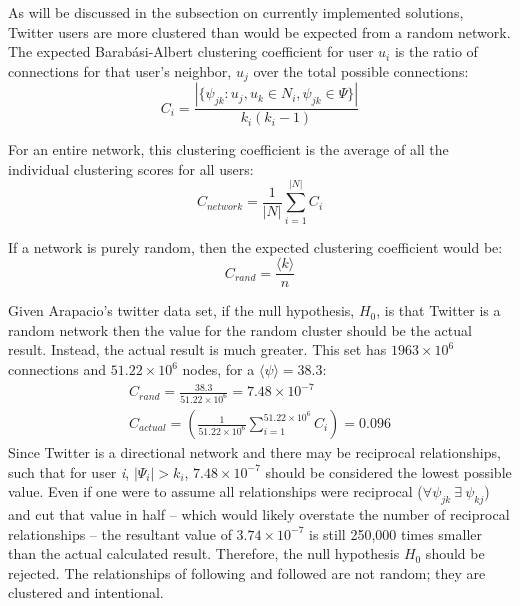 \documentclass[NETN,manuscript]{stjour-new}
\begin{document}
As will be discussed in the subsection on currently implemented solutions, Twitter users are more clustered than would be expected from a random network. The expected Barab{\'a}si-Albert clustering coefficient for user $u_i$ is the ratio of connections for that user's neighbor, $u_j$ over the total possible connections:
\begin{equation}
    C_{i}=\frac{|\{\psi_{jk}: u_j,u_k \in N_i, \psi_{jk} \in \Psi\}|}{k_i(k_i -1)}
\end{equation}

For an entire network, this clustering coefficient is the average of all the individual clustering scores for all users:
\begin{equation}
    C_{network}=\frac{1}{|N|}\sum_{i=1}^{|N|}C_i
\end{equation}

If a network is purely random, then the expected clustering coefficient would be:
\begin{equation}
    C_{rand} = \frac{\langle k \rangle}{n}
\end{equation}

Given Arapacio's twitter data set, if the null hypothesis, $H_0$, is that Twitter is a random network then the value for the random cluster should be the actual result. Instead, the actual result is much greater. This set has $1963 \times 10^6$ connections and $51.22 \times 10^6$ nodes, for a $\langle \psi \rangle = 38.3$:
\begin{equation}
    \begin{split}
    C_{rand} = \frac{38.3}{51.22 \times 10^6} = 7.48 \times 10^{-7} \\
    C_{actual} =\left( \frac{1}{51.22 \times 10^6}\sum_{i=1}^{51.22 \times 10^6}C_i \right)= 0.096
    \end{split}
\end{equation}
Since Twitter is a directional network and there may be reciprocal relationships, such that for user \textit{i}, $|\Psi_i| > k_i$, $7.48 \times 10^{-7}$ should be considered the lowest possible value. Even if one were to assume all relationships were reciprocal ($\forall \psi_{jk}\  \exists \ \psi_{kj}$) and cut that value in half -- which would likely overstate the number of reciprocal relationships -- the resultant value of $3.74 \times 10^{-7}$ is still 250,000 times smaller than the actual calculated result. Therefore, the null hypothesis $H_0$ should be rejected. The relationships of following and followed are not random; they are clustered and intentional.
\end{document}
